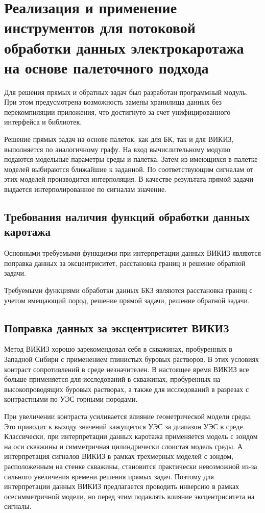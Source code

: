 \chapter{Реализация и применение инструментов для потоковой обработки данных электрокаротажа на основе палеточного подхода} \label{chapt3}


Для решения прямых и обратных задач был разработан программный модуль. При
этом предусмотрена возможность замены хранилища данных без перекомпиляции
приложения, что достигнуто за счет унифицированного интерфейса и библиотек.

Решение прямых задач на основе палеток, как для БК, так и для ВИКИЗ,
выполняется по аналогичному графу. На вход вычислительному модулю подаются
модельные параметры среды и палетка. Затем из имеющихся в палетке моделей
выбираются ближайшие к заданной. По соответствующим сигналам от этих
моделей производится интерполяция. В качестве результата прямой задачи
выдается интерполированное по сигналам значение.


\section{Требования наличия функций обработки данных каротажа} \label{sect3_11}
Основными требуемыми функциями при интерпретации данных ВИКИЗ являются
поправка данных за эксцентриситет, расстановка границ и решение обратной
задачи.

Требуемыми функциями обработки данных БКЗ являются расстановка границ с
учетом вмещающий пород, решение прямой задачи, решение обратной задачи.

\section{Поправка данных за эксцентриситет ВИКИЗ} \label{sect3_12}
Метод ВИКИЗ хорошо зарекомендовал себя в скважинах, пробуренных в Западной
Сибири с применением глинистых буровых растворов. В этих условиях контраст
сопротивлений в среде незначителен. В настоящее время ВИКИЗ все больше
применяется для исследований в скважинах, пробуренных на высокопроводящих
буровых растворах, а также для исследований в разрезах с контрастными по
УЭС горными породами.

При увеличении контраста усиливается влияние геометрической модели среды.
Это приводит к выходу значений кажущегося УЭС за диапазон УЭС в среде.
Классически, при интерпретации данных каротажа применяется модель с зондом
на оси скважины и симметричная цилиндрически слоистая модель среды. А
интерпретация сигналов ВИКИЗ в рамках трехмерных моделей с зондом,
расположенным на стенке скважины, становится практически невозможной из-за
сильного увеличения времени решения прямых задач. Поэтому для интерпретации
данных ВИКИЗ предлагается проводить инверсию в рамках осесимметричной
модели, но перед этим подавлять влияние эксцентриситета на сигналы.

